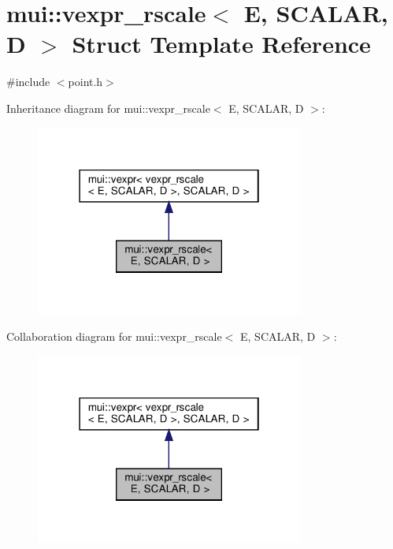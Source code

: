 \hypertarget{structmui_1_1vexpr__rscale}{}\section{mui\+:\+:vexpr\+\_\+rscale$<$ E, S\+C\+A\+L\+AR, D $>$ Struct Template Reference}
\label{structmui_1_1vexpr__rscale}


{\ttfamily \#include $<$point.\+h$>$}



Inheritance diagram for mui\+:\+:vexpr\+\_\+rscale$<$ E, S\+C\+A\+L\+AR, D $>$\+:
\nopagebreak
\begin{figure}[H]
\begin{center}
\leavevmode
\includegraphics[width=250pt]{structmui_1_1vexpr__rscale__inherit__graph}
\end{center}
\end{figure}


Collaboration diagram for mui\+:\+:vexpr\+\_\+rscale$<$ E, S\+C\+A\+L\+AR, D $>$\+:
\nopagebreak
\begin{figure}[H]
\begin{center}
\leavevmode
\includegraphics[width=250pt]{structmui_1_1vexpr__rscale__coll__graph}
\end{center}
\end{figure}
